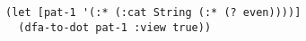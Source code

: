 \begin{lstlisting}[style=reclojureClojure]
(let [pat-1 '(:* (:cat String (:* (? even))))]
  (dfa-to-dot pat-1 :view true))
\end{lstlisting}
